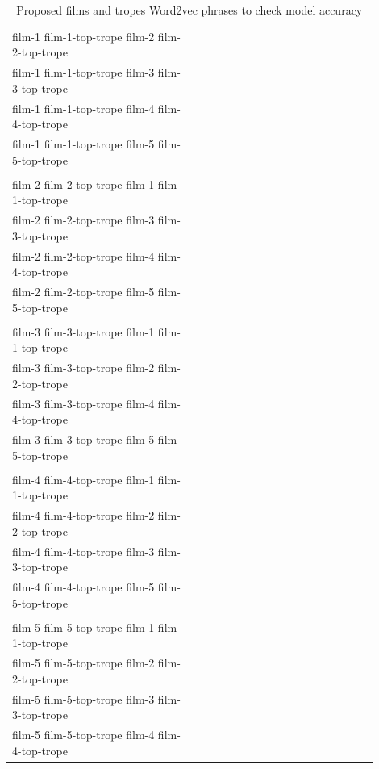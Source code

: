 \documentclass[letterpaper]{article}
\begin{document}
	\begin{table}[ht]
		\centering
		\begin{tabular}{|p{0.45\linewidth}|p{0.45\linewidth}|}
			\hline	      
			film-1 film-1-top-trope film-2 film-2-top-trope\\
			film-1 film-1-top-trope film-3 film-3-top-trope\\
			film-1 film-1-top-trope film-4 film-4-top-trope\\
			film-1 film-1-top-trope film-5 film-5-top-trope\\
			\\
			film-2 film-2-top-trope film-1 film-1-top-trope\\
			film-2 film-2-top-trope film-3 film-3-top-trope\\
			film-2 film-2-top-trope film-4 film-4-top-trope\\
			film-2 film-2-top-trope film-5 film-5-top-trope\\
			\\
			film-3 film-3-top-trope film-1 film-1-top-trope\\
			film-3 film-3-top-trope film-2 film-2-top-trope\\
			film-3 film-3-top-trope film-4 film-4-top-trope\\
			film-3 film-3-top-trope film-5 film-5-top-trope\\
			\\
			film-4 film-4-top-trope film-1 film-1-top-trope\\
			film-4 film-4-top-trope film-2 film-2-top-trope\\
			film-4 film-4-top-trope film-3 film-3-top-trope\\
			film-4 film-4-top-trope film-5 film-5-top-trope\\
			\\
			film-5 film-5-top-trope film-1 film-1-top-trope\\
			film-5 film-5-top-trope film-2 film-2-top-trope\\
			film-5 film-5-top-trope film-3 film-3-top-trope\\
			film-5 film-5-top-trope film-4 film-4-top-trope\\
			\hline
		\end{tabular}
		\caption{Proposed films and tropes Word2vec phrases to check model accuracy}
		\label{tab:proposed-films-tropes-phrases-check-accuracy}
	\end{table}     
	
	
	
\end{document}
